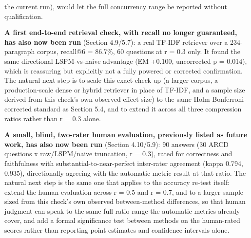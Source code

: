 the current run), would let the full concurrency range be reported without qualification.

\textbf{A first end-to-end retrieval check, with recall no longer guaranteed, has also now been run} (Section 4.9/5.7): a real TF-IDF retriever over a 234-paragraph corpus, recall@6 = 86.7\%, 60 questions at r = 0.3 only. It found the same directional LSPM-vs-naive advantage (EM +0.100, uncorrected p = 0.014), which is reassuring but explicitly not a fully powered or corrected confirmation. The natural next step is to scale this exact check up (a larger corpus, a production-scale dense or hybrid retriever in place of TF-IDF, and a sample size derived from this check's own observed effect size) to the same Holm-Bonferroni-corrected standard as Section 5.4, and to extend it across all three compression ratios rather than r = 0.3 alone.

\textbf{A small, blind, two-rater human evaluation, previously listed as future work, has also now been run} (Section 4.10/5.9): 90 answers (30 ARCD questions x raw/LSPM/naive truncation, r = 0.3), rated for correctness and faithfulness with substantial-to-near-perfect inter-rater agreement (kappa 0.794, 0.935), directionally agreeing with the automatic-metric result at that ratio. The natural next step is the same one that applies to the accuracy re-test itself: extend the human evaluation across r = 0.5 and r = 0.7, and to a larger sample sized from this check's own observed between-method differences, so that human judgment can speak to the same full ratio range the automatic metrics already cover, and add a formal significance test between methods on the human-rated scores rather than reporting point estimates and confidence intervals alone.

